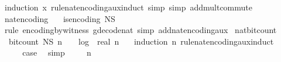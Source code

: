 \begin{isabellebody}
%
\isatagproof
{}\isamarkupfalse%
\ {\isacharparenleft}{\kern0pt}induction\ x\ rule{\isacharcolon}{\kern0pt}nat{\isacharunderscore}{\kern0pt}encoding{\isacharunderscore}{\kern0pt}aux{\isachardot}{\kern0pt}induct{\isacharcomma}{\kern0pt}\ simp{\isacharcomma}{\kern0pt}\ simp\ add{\isacharcolon}{\kern0pt}mult{\isachardot}{\kern0pt}commute{\isacharparenright}{\kern0pt}%
\endisatagproof
{\isafoldproof}%
%
\isadelimproof
\isanewline
%
\endisadelimproof
\isanewline
{}\isamarkupfalse%
\ nat{\isacharunderscore}{\kern0pt}encoding{\isacharcolon}{\kern0pt}\isanewline
\ \ \ {\isachardoublequoteopen}is{\isacharunderscore}{\kern0pt}encoding\ N\isactrlsub S{\isachardoublequoteclose}\isanewline
%
\isadelimproof
\ \ %
\endisadelimproof
%
\isatagproof
{}\isamarkupfalse%
\ {\isacharparenleft}{\kern0pt}rule\ encoding{\isacharunderscore}{\kern0pt}by{\isacharunderscore}{\kern0pt}witness{\isacharbrackleft}{\kern0pt}\ g{\isacharequal}{\kern0pt}{\isachardoublequoteopen}decode{\isacharunderscore}{\kern0pt}nat{\isachardoublequoteclose}{\isacharbrackright}{\kern0pt}{\isacharcomma}{\kern0pt}\ simp\ add{\isacharcolon}{\kern0pt}nat{\isacharunderscore}{\kern0pt}encoding{\isacharunderscore}{\kern0pt}aux{\isacharparenright}{\kern0pt}%
\endisatagproof
{\isafoldproof}%
%
\isadelimproof
\isanewline
%
\endisadelimproof
\isanewline
{}\isamarkupfalse%
\ nat{\isacharunderscore}{\kern0pt}bit{\isacharunderscore}{\kern0pt}count{\isacharcolon}{\kern0pt}\isanewline
\ \ {\isachardoublequoteopen}bit{\isacharunderscore}{\kern0pt}count\ {\isacharparenleft}{\kern0pt}N\isactrlsub S\ n{\isacharparenright}{\kern0pt}\ {\isasymle}\ {}\ {\isacharasterisk}{\kern0pt}\ log\ {}\ {\isacharparenleft}{\kern0pt}real\ n{\isacharplus}{\kern0pt}{}{\isacharparenright}{\kern0pt}\ {\isacharplus}{\kern0pt}\ {}{\isachardoublequoteclose}\isanewline
%
\isadelimproof
%
\endisadelimproof
%
\isatagproof
{}\isamarkupfalse%
\ {\isacharparenleft}{\kern0pt}induction\ n\ rule{\isacharcolon}{\kern0pt}nat{\isacharunderscore}{\kern0pt}encoding{\isacharunderscore}{\kern0pt}aux{\isachardot}{\kern0pt}induct{\isacharparenright}{\kern0pt}\isanewline
\ \ \isamarkupfalse%
\ {}\isanewline
\ \ \isamarkupfalse%
\ \isamarkupfalse%
\ {\isacharquery}{\kern0pt}case\ \isamarkupfalse%
\ simp\isanewline
{}\isamarkupfalse%
\isanewline
\ \ \isamarkupfalse%
\ {\isacharparenleft}{\kern0pt}{}\ n{\isacharparenright}{\kern0pt}\isanewline

\end{isabellebody}
